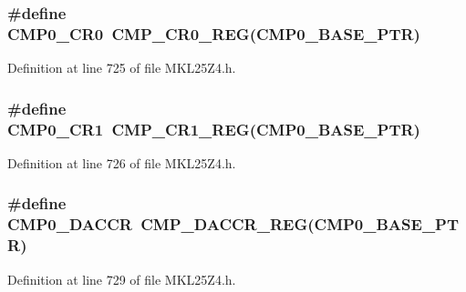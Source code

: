 \subsubsection[{\texorpdfstring{C\+M\+P0\+\_\+\+C\+R0}{CMP0_CR0}}]{\setlength{\rightskip}{0pt plus 5cm}\#define C\+M\+P0\+\_\+\+C\+R0~{\bf C\+M\+P\+\_\+\+C\+R0\+\_\+\+R\+EG}({\bf C\+M\+P0\+\_\+\+B\+A\+S\+E\+\_\+\+P\+TR})}\hypertarget{group___c_m_p___register___accessor___macros_ga0b4ea995265b027fb308b236b2f0afd4}{}\label{group___c_m_p___register___accessor___macros_ga0b4ea995265b027fb308b236b2f0afd4}


Definition at line 725 of file M\+K\+L25\+Z4.\+h.

\subsubsection[{\texorpdfstring{C\+M\+P0\+\_\+\+C\+R1}{CMP0_CR1}}]{\setlength{\rightskip}{0pt plus 5cm}\#define C\+M\+P0\+\_\+\+C\+R1~{\bf C\+M\+P\+\_\+\+C\+R1\+\_\+\+R\+EG}({\bf C\+M\+P0\+\_\+\+B\+A\+S\+E\+\_\+\+P\+TR})}\hypertarget{group___c_m_p___register___accessor___macros_ga993cebfc8cb6bcf6caec49cd75218d17}{}\label{group___c_m_p___register___accessor___macros_ga993cebfc8cb6bcf6caec49cd75218d17}


Definition at line 726 of file M\+K\+L25\+Z4.\+h.

\subsubsection[{\texorpdfstring{C\+M\+P0\+\_\+\+D\+A\+C\+CR}{CMP0_DACCR}}]{\setlength{\rightskip}{0pt plus 5cm}\#define C\+M\+P0\+\_\+\+D\+A\+C\+CR~{\bf C\+M\+P\+\_\+\+D\+A\+C\+C\+R\+\_\+\+R\+EG}({\bf C\+M\+P0\+\_\+\+B\+A\+S\+E\+\_\+\+P\+TR})}\hypertarget{group___c_m_p___register___accessor___macros_ga35e0e1f16fe611949cc7970ad0119891}{}\label{group___c_m_p___register___accessor___macros_ga35e0e1f16fe611949cc7970ad0119891}


Definition at line 729 of file M\+K\+L25\+Z4.\+h.


